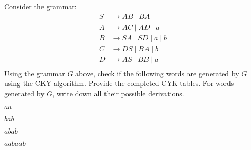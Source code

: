   Consider the grammar:
  \begin{align*}
    S &\rightarrow AB \mid BA \\
    A &\rightarrow AC \mid AD \mid a \\
    B &\rightarrow SA \mid SD \mid a \mid b \\
    C &\rightarrow DS \mid BA \mid b \\
    D &\rightarrow AS \mid BB \mid a \\
  \end{align*}
  Using the grammar $G$ above, check if the following words are generated
  by $G$ using the CKY algorithm. Provide the completed CYK tables.
  For words generated by $G$, write down all their
  possible derivations. 
  \begin{tightlist}
  \item $aa$
  \item $bab$
  \item $abab$
  \item $aabaab$
  \end{tightlist}
